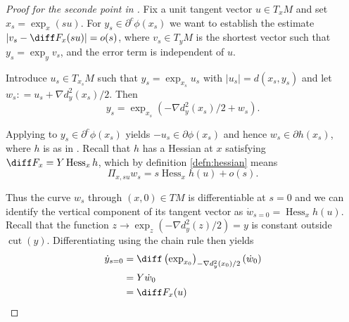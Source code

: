 \begin{proof}[Proof for the seconde point in ]
	Fix a unit tangent vector \( u \in T _ { x } M \) and set \( x _ { s } = \exp _ { x } ( s u ) \).
	For \( y _ { s } \in \partial ^ { c } \phi \left( x _ { s } \right) \) we want
	to establish the estimate \( \left| v _ { s } - \diff F _ { x } ( s u ) \right| = o ( s ) \),
	where \( v _ { s } \in T _ { y } M \) is the shortest vector such that
	\( y _ { s } = \exp _ { y } v _ { s } \),
	and the error term is independent of \( u \).

	Introduce \( u _ { s } \in T _ { x _ { s } } M \) such that \( y _ { s } = \exp _ { x _ { s } } u _ { s } \) with \( \left| u _ { s } \right| = d \left( x _ { s } , y _ { s } \right) \)
	and let \( w _ { s } : = u _ { s } + \nabla d _ { y } ^ { 2 } \left( x _ { s } \right) / 2 \).
	Then
	\begin{equation}
		\label{proof:y_s_definition}
		y _ { s } = \exp _ { x _ { s } }
		\left( - \nabla d _ { y } ^ { 2 } \left( x _ { s } \right) / 2 + w _ { s } \right).
	\end{equation}

	Applying   to \( y _ { s } \in \partial ^ { c } \phi \left( x _ { s } \right) \) yields \( - u _ { s } \in \partial \phi \left( x _ { s } \right) \)
	and hence
	\( w _ { s } \in \partial h \left( x _ { s } \right) \),
	where \( h \) is as in .
	Recall that \( h \) has a Hessian at \( x \) satisfying \( \diff F _ { x } = Y \operatorname { Hess } _ { x } h \),
	which by definition \cref{defn:hessian} means
	\begin{equation}
		\label{proof:hessian_definition}
		\Pi _ { x , s u } w _ { s } = s \operatorname{ Hess } _ { x } h ( u ) + o ( s ).
	\end{equation}

	Thus the curve \( w _ { s } \) through \( ( x , 0 ) \in T M \) is differentiable at \( s = 0 \)
	and we can
	identify the vertical component of its tangent vector as
	\( \dot { w } _ { s = 0 } = \operatorname { Hess } _ { x } h ( u ) . \)
	Recall that the function \( z \rightarrow \exp _ { z } \left( - \nabla d _ { y } ^ { 2 } ( z ) / 2 \right) = y \)
	is constant outside \( \operatorname{cut}( y ) \).
	Differentiating  using the chain rule then yields
	\begin{align*}
		\dot { y } _ { s = 0 } & = \diff \left( \exp _ { x _ { 0 } } \right) _ { - \nabla d _ { y } ^ { 2 } \left( x _ { 0 } \right) / 2 } \left( \dot { w } _ { 0 } \right) \\ & = Y \dot { w } _ { 0 } \\ & = \diff F _ { x } ( u )
	\end{align*}


\end{proof}
